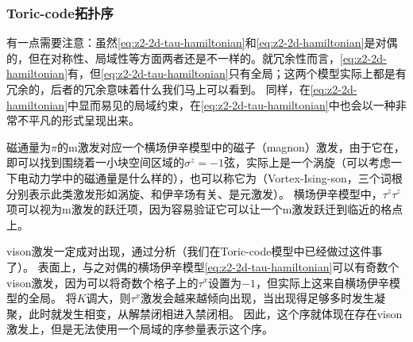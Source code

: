 \subsubsection{Toric-code拓扑序}\label{sec:z2-topo-excitation}

有一点需要注意：虽然\eqref{eq:z2-2d-tau-hamiltonian}和\eqref{eq:z2-2d-hamiltonian}是对偶的，但在对称性、局域性等方面两者还是不一样的。就冗余性而言，\eqref{eq:z2-2d-hamiltonian}有，但\eqref{eq:z2-2d-tau-hamiltonian}只有全局；这两个模型实际上都是有冗余的，后者的冗余意味着什么我们马上可以看到。
同样，在\eqref{eq:z2-2d-hamiltonian}中显而易见的局域约束，在\eqref{eq:z2-2d-tau-hamiltonian}中也会以一种非常不平凡的形式呈现出来。


磁通量为$\pi$的m激发对应一个横场伊辛模型中的磁子（magnon）激发，由于它在，即可以找到围绕着一小块空间区域的$\sigma^z=-1$弦，实际上是一个涡旋（可以考虑一下电动力学中的磁通量是什么样的），也可以称它为（Vortex-Ising-son，三个词根分别表示此类激发形如涡旋、和伊辛场有关、是元激发）。
横场伊辛模型中，$\tau^z \tau^z$项可以视为m激发的跃迁项，因为容易验证它可以让一个m激发跃迁到临近的格点上。

vison激发一定成对出现，通过分析（我们在Toric-code模型中已经做过这件事了）。
表面上，与之对偶的横场伊辛模型\eqref{eq:z2-2d-tau-hamiltonian}可以有奇数个vison激发，因为可以将奇数个格子上的$\tau^x$设置为$-1$，但实际上这来自横场伊辛模型的全局。
将$K$调大，则$\tau^x$激发会越来越倾向出现，当出现得足够多时发生凝聚，此时就发生相变，从解禁闭相进入禁闭相。
因此，这个序就体现在存在vison激发上，但是无法使用一个局域的序参量表示这个序。

